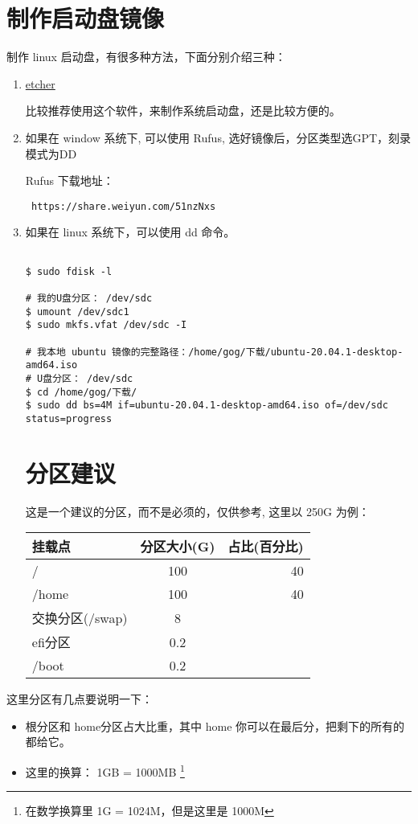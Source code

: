\section{制作启动盘镜像}
制作 linux 启动盘，有很多种方法，下面分别介绍三种：
\flushleft
\begin{enumerate}

\item \href{https://www.balena.io/etcher/}{etcher}

比较推荐使用这个软件，来制作系统启动盘，还是比较方便的。

\item 如果在 window 系统下, 可以使用 Rufus, 选好镜像后，分区类型选GPT，刻录模式为DD

Rufus 下载地址：\\
\begin{lstlisting}
 https://share.weiyun.com/51nzNxs
\end{lstlisting}
\item 如果在 linux 系统下，可以使用 dd 命令。
\begin{lstlisting}

$ sudo fdisk -l 

# 我的U盘分区： /dev/sdc
$ umount /dev/sdc1
$ sudo mkfs.vfat /dev/sdc -I

# 我本地 ubuntu 镜像的完整路径：/home/gog/下载/ubuntu-20.04.1-desktop-amd64.iso 
# U盘分区： /dev/sdc
$ cd /home/gog/下载/
$ sudo dd bs=4M if=ubuntu-20.04.1-desktop-amd64.iso of=/dev/sdc status=progress
\end{lstlisting}

\section{分区建议}
这是一个建议的分区，而不是必须的，仅供参考, 这里以 250G 为例：


\begin{tabular}{|l|c|r|}
\hline
 挂载点 & 分区大小(G) & 占比(百分比)\\
\hline
   / & 100 & 40 \\      
\hline
   /home & 100 & 40 \\      
\hline
  交换分区(/swap) & 8 & \\
\hline
  efi分区 & 0.2 & \\
\hline
  /boot & 0.2 & \\
\hline

\end{tabular}
\end{enumerate}


\setlength\parindent{2em}这里分区有几点要说明一下：

\begin{itemize}
\item 根分区和 home分区占大比重，其中 home 你可以在最后分，把剩下的所有的都给它。
\item 这里的换算： 1GB = 1000MB \footnote{在数学换算里 1G = 1024M，但是这里是 1000M}
\end{itemize}
